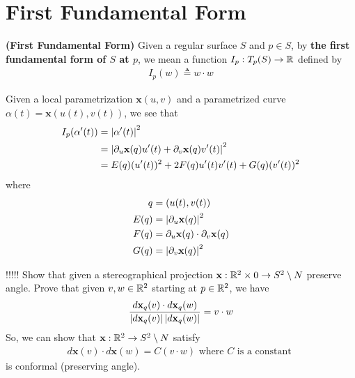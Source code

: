 \documentclass{report}
\begin{document}
\section{First Fundamental Form}
\begin{definition}
\textbf{(First Fundamental Form)} Given a regular surface $S$ and $p\in  S$, by \textbf{the first fundamental form of $S$ at $p$}, we mean a function $I_p:T_p(S)\rightarrow \mathbb{R}$ defined by 
\begin{align*}
I_p(w)\triangleq w\cdot w
\end{align*}
\end{definition}
\begin{mdframed}
Given a local parametrization $\textbf{x}(u,v)$ and a parametrized curve $\alpha (t)=\textbf{x}(u(t),v(t))$, we see that  
\begin{align*}
I_p(\alpha '(t))&=\left|\alpha '(t)\right|^2\\
&=\left|\partial_u \textbf{x}(q) u'(t)+ \partial_v \textbf{x}(q) v'(t)\right|^2 \\
&=E(q)(u'(t))^2+ 2F(q)u'(t)v'(t)+G(q)(v'(t))^2
\end{align*}
where 
\begin{align*}
q&=(u(t),v(t))\\
E(q)&= \left|\partial_u \textbf{x}(q)\right|^2 \\
F(q)&= \partial_u\textbf{x}(q)\cdot \partial_v \textbf{x}(q)\\
G(q)&=\left|\partial_v \textbf{x}(q)\right|^2
\end{align*}
\end{mdframed}
\begin{mdframed}
!!!!! Show that given a stereographical projection $\textbf{x}:\mathbb{R}^2 \times 0 \rightarrow S^2\setminus N$ preserve angle. Prove that given $v,w \in\mathbb{R}^2$ starting at $p\in\mathbb{R}^2$, we have 
\begin{align*}
\frac{d\textbf{x}_q(v)\cdot d\textbf{x}_q(w)}{\left|d\textbf{x}_q(v)\right|\left|d\textbf{x}_q(w)\right|}=v\cdot w
\end{align*}
So, we can show that  $\textbf{x}:\mathbb{R}^2 \rightarrow S^2 \setminus N$ satisfy 
\begin{align*}
d\textbf{x}(v)\cdot d\textbf{x}(w)= C (v\cdot w)\text{ where }C\text{ is a constant }
\end{align*}
is conformal (preserving angle). 
\end{mdframed}
\end{document}
